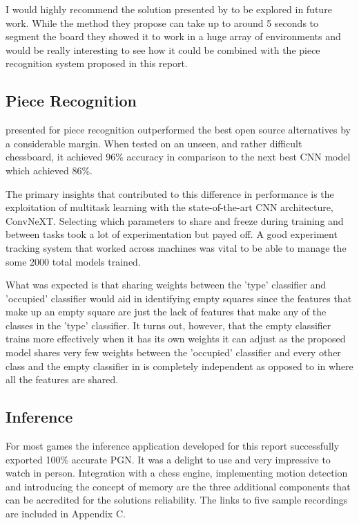 I would highly recommend the solution presented by \cite{} to be explored in future work.  While the method they propose can take up to around 5 seconds 
to segment the board they showed it to work in a huge array of environments and would be really interesting to see how it could be combined with the 
piece recognition system proposed in this report.

\subsection{Piece Recognition}
 presented for piece recognition outperformed the best open source alternatives by a considerable margin. 
When tested on an unseen, and rather difficult chessboard, it achieved 96\% accuracy in comparison to the next best CNN model which achieved 86\%.

The primary insights that contributed to this difference in performance is the exploitation of multitask learning with the state-of-the-art 
CNN architecture, ConvNeXT.  Selecting which parameters to share and freeze during training and between tasks took a lot of experimentation but payed off.
A good experiment tracking system that worked across machines was vital to be able to manage the some 2000 total models trained. 

What was expected is that sharing weights between 
the 'type' classifier and 'occupied' classifier would aid in identifying empty squares since the features that make up an empty square are just the lack of 
features that make any of the classes in the 'type' classifier.  It turns out, however, that the empty classifier trains more effectively when it has its own 
weights it can adjust as the proposed model shares very few weights between the 'occupied' classifier and every other class and the empty classifier in \cite{} 
is completely independent as opposed to in \cite{} where all the features are shared.

\subsection{Inference}
For most games the inference application developed for this report successfully exported 100\% accurate PGN.  It was a delight to use and very impressive to 
watch in person.  Integration with a chess engine, implementing motion detection and introducing the concept of memory are the three additional components 
that can be accredited for the solutions reliability.  The links to five sample recordings are included in Appendix C.


